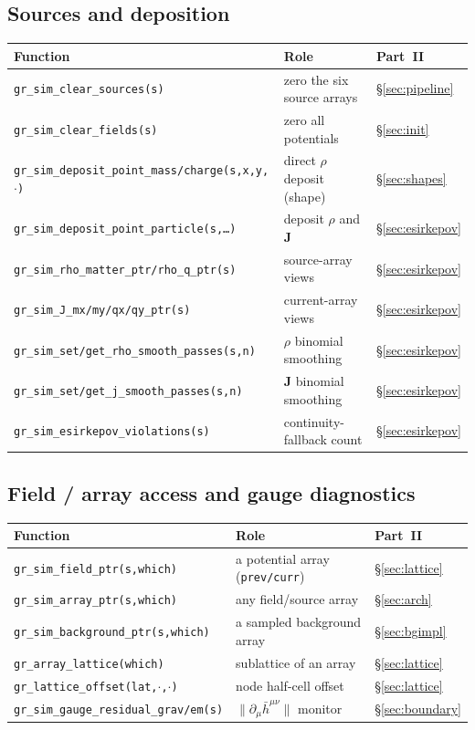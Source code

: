\documentclass[11pt]{article}
\newcommand{\vv}[1]{\mathbf{#1}}           %
\begin{document}
\subsection{Sources and deposition}
\nopagebreak
{\footnotesize
\begin{tabular}{@{}F{8.2cm}L{4.9cm}L{1.4cm}@{}}
\toprule
\textbf{Function} & \textbf{Role} & \textbf{Part~II} \\
\midrule
\texttt{gr\_sim\_clear\_sources(s)} & zero the six source arrays & \S\ref{sec:pipeline} \\
\texttt{gr\_sim\_clear\_fields(s)} & zero all potentials & \S\ref{sec:init} \\
\texttt{gr\_sim\_deposit\_point\_mass/charge(s,x,y,$\cdot$)} & direct $\rho$ deposit (shape) & \S\ref{sec:shapes} \\
\texttt{gr\_sim\_deposit\_point\_particle(s,\dots)} & deposit $\rho$ and $\vv J$ & \S\ref{sec:esirkepov} \\
\texttt{gr\_sim\_rho\_matter\_ptr/rho\_q\_ptr(s)} & source-array views & \S\ref{sec:esirkepov} \\
\texttt{gr\_sim\_J\_mx/my/qx/qy\_ptr(s)} & current-array views & \S\ref{sec:esirkepov} \\
\texttt{gr\_sim\_set/get\_rho\_smooth\_passes(s,n)} & $\rho$ binomial smoothing & \S\ref{sec:esirkepov} \\
\texttt{gr\_sim\_set/get\_j\_smooth\_passes(s,n)} & $\vv J$ binomial smoothing & \S\ref{sec:esirkepov} \\
\texttt{gr\_sim\_esirkepov\_violations(s)} & continuity-fallback count & \S\ref{sec:esirkepov} \\
\bottomrule
\end{tabular}}

\subsection{Field / array access and gauge diagnostics}
\nopagebreak
{\footnotesize
\begin{tabular}{@{}F{8.2cm}L{4.9cm}L{1.4cm}@{}}
\toprule
\textbf{Function} & \textbf{Role} & \textbf{Part~II} \\
\midrule
\texttt{gr\_sim\_field\_ptr(s,which)} & a potential array (\texttt{prev/curr}) & \S\ref{sec:lattice} \\
\texttt{gr\_sim\_array\_ptr(s,which)} & any field/source array & \S\ref{sec:arch} \\
\texttt{gr\_sim\_background\_ptr(s,which)} & a sampled background array & \S\ref{sec:bgimpl} \\
\texttt{gr\_array\_lattice(which)} & sublattice of an array & \S\ref{sec:lattice} \\
\texttt{gr\_lattice\_offset(lat,$\cdot$,$\cdot$)} & node half-cell offset & \S\ref{sec:lattice} \\
\texttt{gr\_sim\_gauge\_residual\_grav/em(s)} & $\|\partial_\mu\bar h^{\mu\nu}\|$ monitor & \S\ref{sec:boundary} \\
\bottomrule
\end{tabular}}
\end{document}
